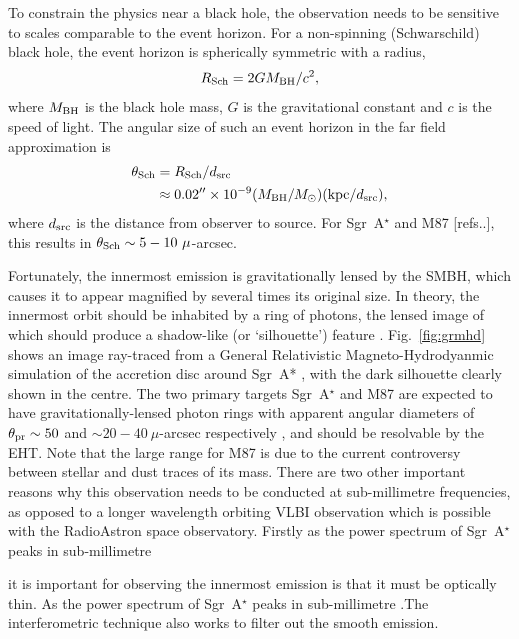 To constrain the physics near a black hole, the observation needs to be sensitive to scales comparable to the event horizon. For a non-spinning (Schwarschild) black hole, the event horizon is spherically symmetric with a radius, 
\begin{equation}
R_{\rm Sch} = 2 G M_{\rm BH} /c^2,
\end{equation}
where $M_{\rm BH}$ is the black hole mass, $G$ is the gravitational constant and $c$ is the speed of light. The angular size of such an event horizon in the far field approximation is
\begin{align}
\theta_{\rm Sch} &= R_{\rm Sch} / d_{\rm src}\\
&\approx 0.02^{\prime \prime} \times 10^{-9} (M_{\rm BH}/M_\odot)({\rm kpc}/d_{\rm src}),
\end{align}
where $d_{\rm src}$ is the distance from observer to source. For Sgr~A$^\star$ and M87 [refs..], this results in $\theta_{\rm Sch} \sim 5-10\ \mu$-arcsec.

Fortunately, the innermost emission is gravitationally lensed by the SMBH, which causes it to appear magnified by several times its original size. In theory, the innermost orbit should be inhabited by a ring of photons, the lensed image of which should produce a shadow-like (or `silhouette') feature \citep{Doeleman_2010}. Fig.~\ref{fig:grmhd} shows an image ray-traced from a General Relativistic Magneto-Hydrodyanmic simulation of the accretion disc around Sgr~A* \citep{Moscibrodzka_2014}, with the dark silhouette clearly shown in the centre. The two primary targets Sgr~A$^\star$ and M87 are expected to have gravitationally-lensed photon rings with apparent angular diameters of $\theta_{\rm pr} \sim 50$ and $\sim 20-40\ \mu$-arcsec respectively \citep*{Falcke_2013,Broderick_2009}, and should be resolvable by the EHT. Note that the large range for M87 is due to the current controversy between stellar and dust traces of its mass.
There are two other important reasons why this observation needs to be conducted at sub-millimetre frequencies, as opposed to a longer wavelength orbiting VLBI observation which is possible with the RadioAstron space observatory. Firstly as the power spectrum of Sgr~A$^\star$ peaks in sub-millimetre \citep{Serabyn_1997,Falcke_1998}

it is important for observing the innermost emission is that it must be optically thin. As the power spectrum of Sgr~A$^\star$ peaks in sub-millimetre \citep{Serabyn_1997,Falcke_1998}.The interferometric technique also works to filter out the smooth emission. 

